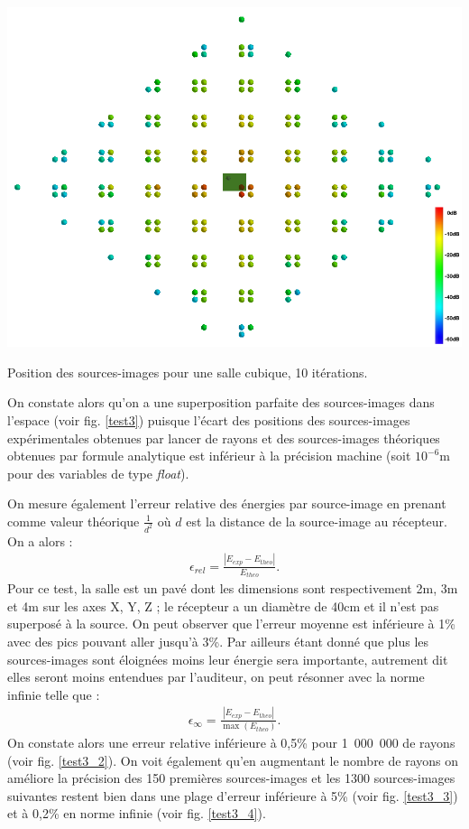 \begin{figureth}
		\includegraphics[width=\linewidth]{images/test3_0}
		\caption{Position des sources-images pour une salle cubique, 10 itérations.}
		\label{test3}
	\end{figureth}

On constate alors qu'on a une superposition parfaite des sources-images dans l'espace (voir fig. \ref{test3}) puisque l'écart des positions des sources-images expérimentales obtenues par lancer de rayons et des sources-images théoriques obtenues par formule analytique est inférieur à la précision machine (soit $10^{-6}$m pour des variables de type \textit{float}). 

On mesure également l'erreur relative des énergies par source-image en prenant comme valeur théorique $\frac{1}{d^2}$ où $d$ est la distance de la source-image au récepteur. On a alors :
\begin{align}
\epsilon_{rel} = \frac{|E_{exp}-E_{theo}|}{E_{theo}}.
\end{align}
%
Pour ce test, la salle est un pavé dont les dimensions sont respectivement 2m, 3m et 4m sur les axes X, Y, Z ; le récepteur a un diamètre de 40cm et il n'est pas superposé à la source. On peut observer que l'erreur moyenne est inférieure à 1\% avec des pics pouvant aller jusqu'à 3\%. Par ailleurs étant donné que plus les sources-images sont éloignées moins leur énergie sera importante, autrement dit elles seront moins entendues par l'auditeur, on peut résonner avec la norme infinie telle que :
\begin{align}
\epsilon_{\infty} = \frac{|E_{exp}-E_{theo}|}{\max(E_{theo})}.
\end{align}
%
On constate alors une erreur relative inférieure à 0,5\% pour 1~000~000 de rayons (voir fig. \ref{test3_2}). On voit également qu'en augmentant le nombre de rayons on améliore la précision des 150 premières sources-images et les 1300 sources-images suivantes restent bien dans une plage d'erreur inférieure à 5\% (voir fig. \ref{test3_3}) et à 0,2\% en norme infinie (voir fig. \ref{test3_4}).

